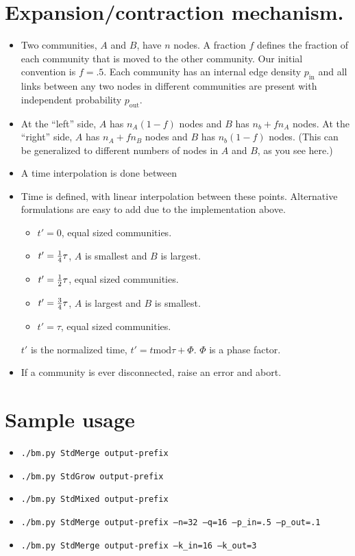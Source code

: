 \documentclass{article}
\def\pin{p_\mathrm{in}}
\def\pout{p_\mathrm{out}}
\begin{document}
\section{Expansion/contraction mechanism.}
\begin{itemize}
\item Two communities, $A$ and $B$, have $n$ nodes.  A fraction $f$
  defines the fraction of each community that is moved to the other
  community.  Our initial convention is $f=.5$.  Each community has an
  internal edge density $\pin$ and all links between any two nodes in
  different communities are present with independent probability
  $\pout$.
\item At the ``left'' side, $A$ has $n_A(1-f)$ nodes and $B$ has
  $n_b+f n_A$ nodes.  At the ``right'' side, $A$ has $n_A + f n_B$
  nodes and $B$ has $n_b(1-f)$ nodes.  (This can be generalized to
  different numbers of nodes in $A$ and $B$, as you see here.)
\item A time interpolation is done between
\item Time is defined, with linear interpolation between these
  points.  Alternative formulations are easy to add due to the
  implementation above.
  \begin{itemize}
  \item $t'=0$, equal sized communities.
  \item $t'={1 \over 4} \tau$, $A$ is smallest and $B$ is largest.
  \item $t'={1 \over 2} \tau$, equal sized communities.
  \item $t'={3 \over 4} \tau$, $A$ is largest and $B$ is smallest.
  \item $t'=\tau$, equal sized communities.
  \end{itemize}
  $t'$ is the normalized time, $t' = t \mathrm{mod} \tau + \Phi$.  $\Phi$ is a
  phase factor.
\item If a community is ever disconnected, raise an error and abort.
\end{itemize}

\section{Sample usage}

\begin{itemize}
\item \texttt{./bm.py StdMerge output-prefix}
\item \texttt{./bm.py StdGrow output-prefix}
\item \texttt{./bm.py StdMixed output-prefix}
\item \texttt{./bm.py StdMerge output-prefix --n=32 --q=16 --p\_in=.5 --p\_out=.1}
\item \texttt{./bm.py StdMerge output-prefix --k\_in=16 --k\_out=3}
\end{itemize}
\end{document}
